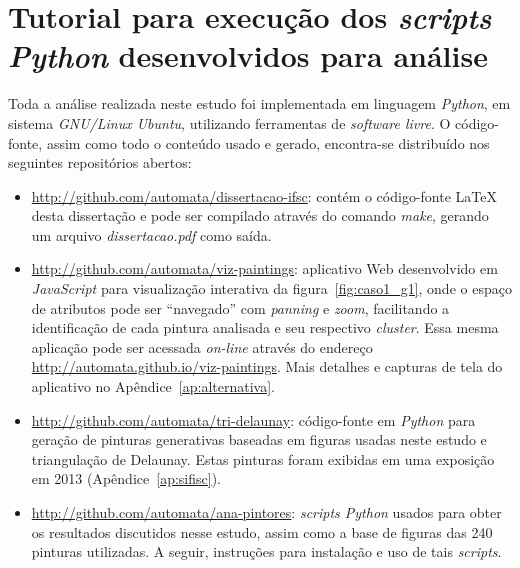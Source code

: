 \chapter{Tutorial para execução dos \textit{scripts Python} desenvolvidos para análise}
\label{cap:ap-tutorial}

Toda a análise realizada neste estudo foi implementada em linguagem
\textit{Python}, em sistema \textit{GNU/Linux Ubuntu}, utilizando
ferramentas de \textit{software livre}. O código-fonte, assim como
todo o conteúdo usado e gerado, encontra-se distribuído nos seguintes
repositórios abertos:

\begin{itemize}
  \item{\url{http://github.com/automata/dissertacao-ifsc}: contém o
    código-fonte \LaTeX \, desta dissertação e pode ser compilado através
    do comando \textit{make}, gerando um arquivo
    \textit{dissertacao.pdf} como saída.}
  \item{\url{http://github.com/automata/viz-paintings}: aplicativo Web
    desenvolvido em \textit{JavaScript} para visualização interativa
    da figura~\ref{fig:caso1_g1}, onde o espaço de atributos pode ser
    ``navegado'' com \textit{panning} e \textit{zoom}, facilitando a
    identificação de cada pintura analisada e seu respectivo
    \textit{cluster}. Essa mesma aplicação pode ser acessada
    \textit{on-line} através do endereço
    \url{http://automata.github.io/viz-paintings}. Mais detalhes e
    capturas de tela do aplicativo no Apêndice~\ref{ap:alternativa}.}
  \item{\url{http://github.com/automata/tri-delaunay}: código-fonte em
    \textit{Python} para geração de pinturas generativas baseadas em
    figuras usadas neste estudo e triangulação de Delaunay. Estas
    pinturas foram exibidas em uma exposição em 2013
    (Apêndice~\ref{ap:sifisc}).}
  \item{\url{http://github.com/automata/ana-pintores}: \textit{scripts
      Python} usados para obter os resultados discutidos nesse estudo,
    assim como a base de figuras das 240 pinturas utilizadas. A
    seguir, instruções para instalação e uso de tais
    \textit{scripts}.}
\end{itemize}

